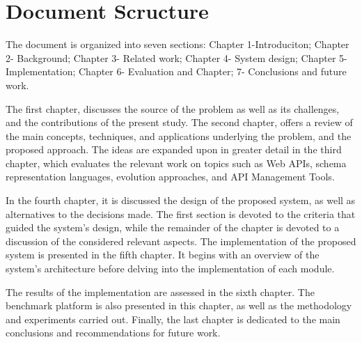 \section{Document Scructure} %
\label{sec:document_structure}

The document is organized into seven sections: Chapter 1-Introduciton; Chapter 2-
Background; Chapter 3- Related work; Chapter 4- System design; Chapter 5- Implementation;
Chapter 6- Evaluation and Chapter; 7- Conclusions and future work.

The first chapter, discusses the source of the problem as well as its challenges,
and the contributions of the present study.
The second chapter, offers a review of the main concepts, techniques, and
applications underlying the problem, and the proposed approach.
The ideas are expanded upon in greater detail in the third chapter, which evaluates the relevant work on topics such as
Web APIs, schema representation languages, evolution approaches, and API Management Tools.

In the fourth chapter, it is discussed the design of the proposed system, as well
as alternatives to the decisions made.
The first section is devoted to the
criteria that guided the system's design, while the remainder of the chapter is devoted to a
discussion of the considered relevant aspects.
The implementation of the proposed system is presented in the fifth chapter.
It begins with an overview of the system's architecture before delving into the implementation of each module.

The results of the implementation are assessed in the sixth chapter.
The benchmark platform is also presented in this chapter, as well as the methodology and experiments carried out.
Finally, the last chapter is dedicated to the main conclusions and recommendations for future
work.

